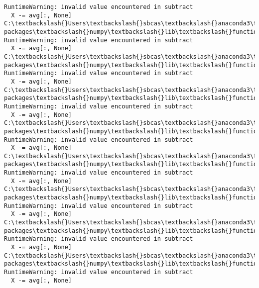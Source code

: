 \documentclass[11pt]{article}
\begin{document}
\begin{Verbatim}[commandchars=\\\{\}]
RuntimeWarning: invalid value encountered in subtract
  X -= avg[:, None]
C:\textbackslash{}Users\textbackslash{}sbcas\textbackslash{}anaconda3\textbackslash{}lib\textbackslash{}site-packages\textbackslash{}numpy\textbackslash{}lib\textbackslash{}function\_base.py:2474:
RuntimeWarning: invalid value encountered in subtract
  X -= avg[:, None]
C:\textbackslash{}Users\textbackslash{}sbcas\textbackslash{}anaconda3\textbackslash{}lib\textbackslash{}site-packages\textbackslash{}numpy\textbackslash{}lib\textbackslash{}function\_base.py:2474:
RuntimeWarning: invalid value encountered in subtract
  X -= avg[:, None]
C:\textbackslash{}Users\textbackslash{}sbcas\textbackslash{}anaconda3\textbackslash{}lib\textbackslash{}site-packages\textbackslash{}numpy\textbackslash{}lib\textbackslash{}function\_base.py:2474:
RuntimeWarning: invalid value encountered in subtract
  X -= avg[:, None]
C:\textbackslash{}Users\textbackslash{}sbcas\textbackslash{}anaconda3\textbackslash{}lib\textbackslash{}site-packages\textbackslash{}numpy\textbackslash{}lib\textbackslash{}function\_base.py:2474:
RuntimeWarning: invalid value encountered in subtract
  X -= avg[:, None]
C:\textbackslash{}Users\textbackslash{}sbcas\textbackslash{}anaconda3\textbackslash{}lib\textbackslash{}site-packages\textbackslash{}numpy\textbackslash{}lib\textbackslash{}function\_base.py:2474:
RuntimeWarning: invalid value encountered in subtract
  X -= avg[:, None]
C:\textbackslash{}Users\textbackslash{}sbcas\textbackslash{}anaconda3\textbackslash{}lib\textbackslash{}site-packages\textbackslash{}numpy\textbackslash{}lib\textbackslash{}function\_base.py:2474:
RuntimeWarning: invalid value encountered in subtract
  X -= avg[:, None]
C:\textbackslash{}Users\textbackslash{}sbcas\textbackslash{}anaconda3\textbackslash{}lib\textbackslash{}site-packages\textbackslash{}numpy\textbackslash{}lib\textbackslash{}function\_base.py:2474:
RuntimeWarning: invalid value encountered in subtract
  X -= avg[:, None]
C:\textbackslash{}Users\textbackslash{}sbcas\textbackslash{}anaconda3\textbackslash{}lib\textbackslash{}site-packages\textbackslash{}numpy\textbackslash{}lib\textbackslash{}function\_base.py:2474:
RuntimeWarning: invalid value encountered in subtract
  X -= avg[:, None]
    \end{Verbatim}
\end{document}
